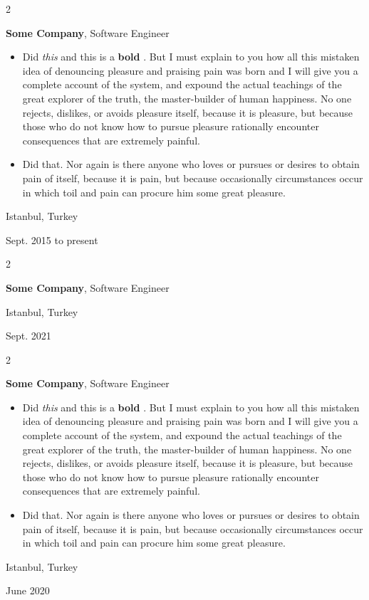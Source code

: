 \documentclass[10pt, letterpaper]{article}
\newenvironment{highlights}{
    \begin{itemize}[
        topsep=0.10 cm,
        parsep=0.10 cm,
        partopsep=0pt,
        itemsep=0pt,
        leftmargin=0.4 cm + 10pt
    ]
}{
    \end{itemize}
} %
\newenvironment{twocolentry}[2][]{
    \onecolentry
    \def\secondColumn{#2}
    \setcolumnwidth{\fill, 4.5 cm}
    \begin{paracol}{2}
}{
    \switchcolumn \raggedleft \secondColumn
    \end{paracol}
    \endonecolentry
} %
\let\hrefWithoutArrow\href
\renewcommand{\href}[2]{\hrefWithoutArrow{#1}{\mbox{\ifthenelse{\equal{#2}{}}{ }{#2 }\raisebox{.15ex}{\footnotesize \faExternalLink*}}}}
\begin{document}
        \begin{twocolentry}{
            Istanbul, Turkey

        Sept. 2015 to present
        }
            \textbf{Some \textnormal{Company}}, Software Engineer
            \begin{highlights}
                \item Did \textit{this} and this is a \textbf{bold} \href{https://example.com}{link}. But I must explain to you how all this mistaken idea of denouncing pleasure and praising pain was born and I will give you a complete account of the system, and expound the actual teachings of the great explorer of the truth, the master-builder of human happiness. No one rejects, dislikes, or avoids pleasure itself, because it is pleasure, but because those who do not know how to pursue pleasure rationally encounter consequences that are extremely painful.
                \item Did that. Nor again is there anyone who loves or pursues or desires to obtain pain of itself, because it is pain, but because occasionally circumstances occur in which toil and pain can procure him some great pleasure.
            \end{highlights}
        \end{twocolentry}


        \vspace{0.2 cm}

        \begin{twocolentry}{
            Istanbul, Turkey

        Sept. 2021
        }
            \textbf{Some \textnormal{Company}}, Software Engineer
        \end{twocolentry}


        \vspace{0.2 cm}

        \begin{twocolentry}{
            Istanbul, Turkey

        June 2020
        }
            \textbf{Some \textnormal{Company}}, Software Engineer
            \begin{highlights}
                \item Did \textit{this} and this is a \textbf{bold} \href{https://example.com}{link}. But I must explain to you how all this mistaken idea of denouncing pleasure and praising pain was born and I will give you a complete account of the system, and expound the actual teachings of the great explorer of the truth, the master-builder of human happiness. No one rejects, dislikes, or avoids pleasure itself, because it is pleasure, but because those who do not know how to pursue pleasure rationally encounter consequences that are extremely painful.
                \item Did that. Nor again is there anyone who loves or pursues or desires to obtain pain of itself, because it is pain, but because occasionally circumstances occur in which toil and pain can procure him some great pleasure.
            \end{highlights}
        \end{twocolentry}
\end{document}
